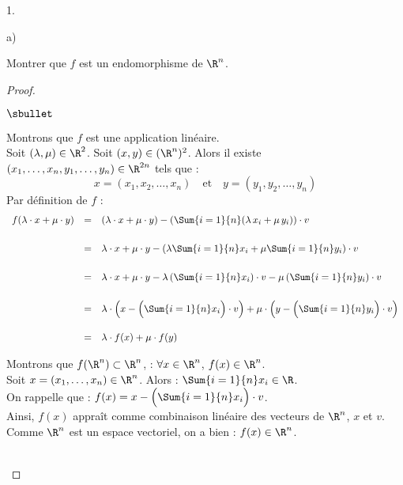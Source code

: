 \documentclass[11pt]{article}%
\begin{document}
\begin{noliste}{1.}
  \setlength{\itemsep}{4mm}
\item
  \begin{noliste}{a)}
    \setlength{\itemsep}{2mm}
  \item Montrer que $f$ est un endomorphisme de $\R^n$.
    
    \begin{proof}~
      \begin{noliste}{$\sbullet$}
      \item Montrons que $f$ est une application linéaire.\\
        Soit $(\lambda, \mu)\in \R^2$. Soit $(x,y)\in (\R^n)^2$.
        Alors il existe $(x_1, \ldots, x_n, y_1, \ldots, y_n) \in
        \R^{2n}$ tels que :
        \[
        x=(x_1,x_2, \ldots, x_n) \quad \mbox{et} \quad
        y=(y_1,y_2, \ldots, y_n)
        \]
        Par définition de $f$ :
        \[
        \begin{array}{rcl}
          f(\lambda \cdot x + \mu \cdot y) & = & (\lambda \cdot x + 
          \mu \cdot y) - \left(\Sum{i=1}{n}(\lambda \, x_i + \mu \, y_i)
          \right) \cdot v
          \\[.6cm]
          & = & \lambda \cdot x + \mu \cdot y - \left(\lambda 
            \Sum{i=1}{n} x_i + \mu \Sum{i=1}{n} y_i \right) \cdot v
          \\[.6cm]
          & = & \lambda \cdot x + \mu \cdot y - \lambda \left( 
            \Sum{i=1}{n} x_i \right) \cdot v - \mu \left( \Sum{i=1}{n} 
            y_i \right) \cdot v
          \\[.6cm]
          & = & \lambda \cdot \left(x - \Big( \Sum{i=1}{n} x_i \Big) 
\cdot 
            v\right) + \mu \cdot \left(y - \Big( \Sum{i=1}{n} y_i \Big) 
\cdot 
            v\right)
          \\[.6cm]
          & = & \lambda \cdot f(x) + \mu \cdot f(y)
        \end{array}
        \]
        
      \item Montrons que $f(\R^n) \subset \R^n$, \ie : $\forall x\in
        \R^n$, $f(x) \in \R^n$.\\
        Soit $x = (x_1, \ldots, x_n) \in \R^n$. Alors : $\Sum{i=1}{n}
        x_i \in \R$.\\
        On rappelle que : $f(x) = x-\Big(\Sum{i=1}{n} x_i\Big) \cdot
        v$.\\
        Ainsi, $f(x)$ appraît comme combinaison linéaire des vecteurs
        de $\R^n$, $x$ et $v$.\\
        Comme $\R^n$ est un espace vectoriel, on a bien : $f(x) \in
        \R^n$.  
      \end{noliste}
      ~\\[-1cm]
    \end{proof}


\end{noliste}
\end{noliste}
\end{document}
